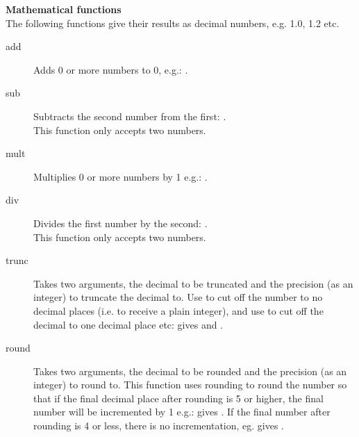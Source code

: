 \textbf{Mathematical functions}\\
The following functions give their results as decimal numbers, e.g. 1.0, 1.2 etc. 
\begin{description}
\item [add]{Adds 0 or more numbers to 0, e.g.: .}
\item [sub]{Subtracts the second number from the first: . \\This function only accepts two numbers.}
\item [mult]{Multiplies 0 or more numbers by 1 e.g.: .}
\item [div]{Divides the first number by the second: . \\This function only accepts two numbers.}
\item [trunc]{Takes two arguments, the decimal to be truncated and the precision (as an integer) to truncate the decimal to. Use  to cut off the number to no decimal places (i.e. to receive a plain integer), and use  to cut off the decimal to one decimal place etc:  gives  and .}
\item [round]{Takes two arguments, the decimal to be rounded and the precision (as an integer) to round to. This function uses  rounding to round the number so that if the final decimal place after rounding is 5 or higher, the final number will be incremented by 1 e.g.:  gives . If the final number after rounding is 4 or less, there is no incrementation, eg.  gives . }
\end{description}

